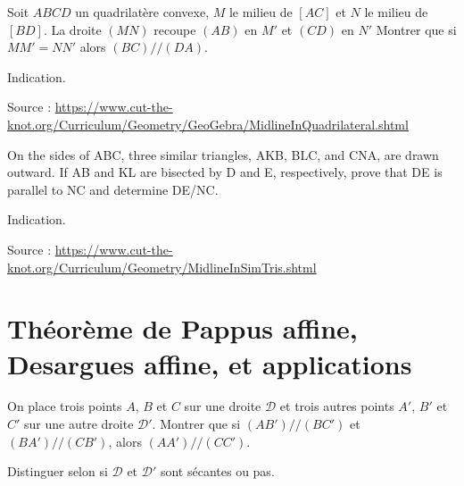 \begin{exo}
Soit $ABCD$ un quadrilatère convexe, $M$ le milieu de $[AC]$ et $N$ le milieu de $[BD]$.
La droite $(MN)$ recoupe $(AB)$ en $M'$ et $(CD)$ en $N'$
Montrer que si $MM' = NN'$ alors $(BC)//(DA)$.
\begin{hint}
Indication.
\end{hint}
\begin{sol}
Source : \url{https://www.cut-the-knot.org/Curriculum/Geometry/GeoGebra/MidlineInQuadrilateral.shtml}
\end{sol}
\end{exo}

\begin{exo}
On the sides of ABC, three similar triangles, AKB, BLC, and CNA, are drawn outward. If AB and KL are bisected by D and E, respectively, prove that DE is parallel to NC and determine DE/NC.
\begin{hint}
Indication.
\end{hint}
\begin{sol}
Source : \url{https://www.cut-the-knot.org/Curriculum/Geometry/MidlineInSimTris.shtml}
\end{sol}
\end{exo}

\section{Théorème de Pappus affine, Desargues affine, et applications}

\begin{exo}
On place trois points $A$, $B$ et $C$ sur une droite $\mathcal D$ et trois autres points $A'$, $B'$ et $C'$ sur une autre droite $\mathcal D'$.
Montrer que si $(AB')//(BC')$ et $(BA')//(CB')$, alors $(AA')//(CC')$.
\begin{center}
\end{center}
\begin{hint}
Distinguer selon si $\mathcal D$ et $\mathcal D'$ sont sécantes ou pas.
\end{hint}
\begin{sol}
\end{sol}
\end{exo}


